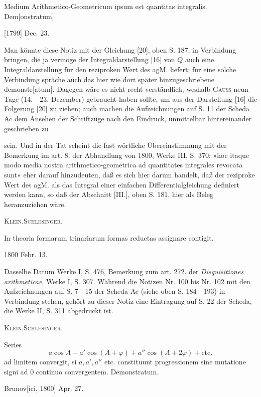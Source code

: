 \indent Medium Arithmetico-Geometricum ipsum est quantitas integralis. Dem[onstratum].
\par\noindent\hfill[1799] Dec. 23.

\medskip\begingroup\small
\indent Man könnte diese Notiz mit der Gleichung [20], oben S. 187, in Verbindung bringen, die ja vermöge der Integraldarstellung [16] von \(Q\) auch eine Integraldarstellung für den reziproken Wert des agM. liefert; für eine solche Verbindung spräche auch das hier wie dort später hinzugeschriebene demonstr[atum]. Dagegen wäre es nicht recht verständlich, weshalb \textsc{Gauss} neun Tage (14.—23. Dezember) gebraucht haben sollte, um aus der Darstellung [16] die Folgerung [20] zu ziehen; auch machen die Aufzeichnungen auf S. 11 der Scheda Ac dem Ansehen der Schriftzüge nach den Eindruck, unmittelbar hintereinander geschrieben zu
\par\endgroup

\clearpage{}
\begingroup\small
\noindent sein. Und in der Tat scheint die fast wörtliche Übereinstimmung mit der Bemerkung im art. 8. der Abhandlung von 1800, Werke III, S. 370: »hoc itaque modo media nostra arithmetico-geometrica ad quantitates integrales revocata sunt« eher darauf hinzudeuten, daß es sich hier darum handelt, daß der reziproke Wert des agM. als das Integral einer einfachen Differentialgleichung definiert werden kann, so daß der Abschnitt [III.], oben S. 181, hier als Beleg heranzuziehen wäre.
\par\noindent\hfill\textsc{Klein.\quad Schlesinger.}
\par\endgroup

\indent In theoria formarum trinariarum formas reductas assignare contigit.
\par\noindent\hfill1800 Febr. 13.

\medskip\begingroup\small
\indent Dasselbe Datum Werke I, S. 476, Bemerkung zum art. 272. der \textit{Disquisitiones arithmeticae}, Werke I, S. 307. Während die Notizen Nr. 100 bis Nr. 102 mit den Aufzeichnungen auf S. 7—15 der Scheda Ac (siehe oben S. 184—193) in Verbindung stehen, gehört zu dieser Notiz eine Eintragung auf S. 22 der Scheda, die Werke II, S. 311 abgedruckt ist.
\par\noindent\hfill\textsc{Klein.\quad Schlesinger.}
\par\endgroup

\indent Series
\[
a\cos A+a'\cos(A+\varphi)+a''\cos(A+2\varphi)+\text{etc.}
\]
\noindent ad limitem convergit, si \(a,a',a''\) etc. constituunt progressionem sine mutatione signi ad \(0\) continuo convergentem. Demonstratum.
\par\noindent\hfill Brunov[ici, 1800] Apr. 27.

